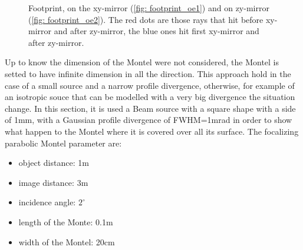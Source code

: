 \begin{figure}[]
%
\centering
%
%
\quad
%
\caption{Footprint, on the xy-mirror (\ref{fig: footprint_oe1}) and on zy-mirror (\ref{fig: footprint_oe2}). The red dots are those rays that hit before xy-mirror and after zy-mirror, the blue ones hit first xy-mirror and after zy-mirror.}
%
\label{fig: footprint}
%
\end{figure}
Up to know the dimension of the Montel were not considered, the Montel is setted to have infinite dimension in all the direction. This approach hold in the case of a small source and a narrow profile divergence, otherwise, for example of an isotropic souce that can be modelled with a very big divergence the situation change. In this section, it is used a Beam source with a square shape with a side of 1mm, with a Gaussian profile divergence of FWHM=1mrad in order to show what happen to the Montel  where it is covered over all its surface. The focalizing parabolic Montel parameter are:
\begin{itemize}
\item object  distance: 1m
\item image distance: 3m
\item incidence angle: $2^{\circ} $
\item length of the Monte: 0.1m
\item width of the Montel: 20cm
\end{itemize}
%
